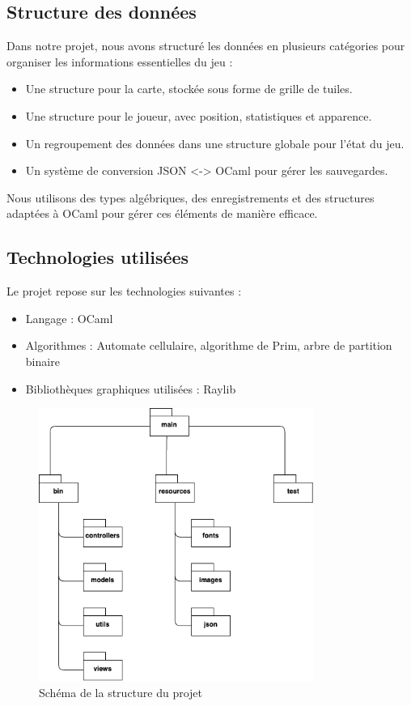 \documentclass{article}
\begin{document}
\subsection{Structure des données}
Dans notre projet, nous avons structuré les données en plusieurs catégories 
pour organiser les informations essentielles du jeu : 
\begin{itemize}
  \item Une structure pour la carte, stockée sous forme de grille de tuiles.
  \item Une structure pour le joueur, avec position, statistiques et apparence.
  \item Un regroupement des données dans une structure globale pour l’état du jeu.
  \item Un système de conversion JSON <-> OCaml pour gérer les sauvegardes.
\end{itemize}
Nous utilisons des types algébriques, des enregistrements et des structures 
adaptées à OCaml pour gérer ces éléments de manière efficace.

\subsection{Technologies utilisées}
Le projet repose sur les technologies suivantes :
\begin{itemize}
    \item Langage : OCaml
    \item Algorithmes : Automate cellulaire, algorithme de Prim, arbre de partition binaire
    \item Bibliothèques graphiques utilisées : Raylib
\end{itemize}

\begin{figure}
  \centering
  \includegraphics[width=0.8\textwidth]{structure.drawio.png}
  \caption{Schéma de la structure du projet}
\end{figure}
\end{document}
